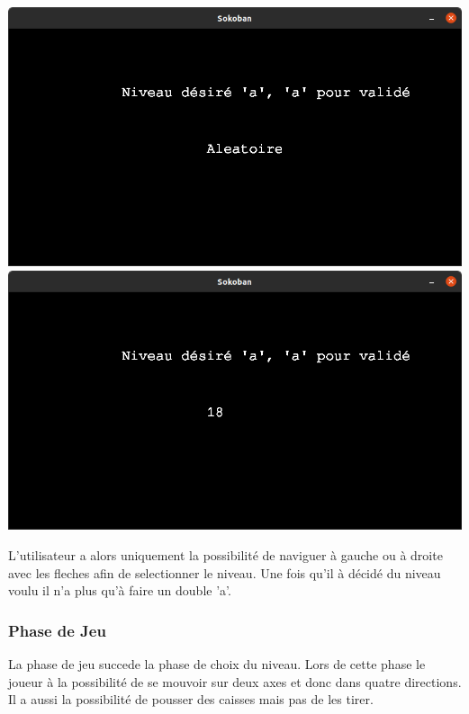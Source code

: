 \documentclass[a4paper,12pt]{article} %
\begin{document}
\includegraphics[scale = 0.25]{../picture/starting.png}
\includegraphics[scale = 0.25]{../picture/starting2.png}

L'utilisateur a alors uniquement la possibilité de naviguer à gauche ou à droite avec les fleches afin de selectionner le niveau.
Une fois qu'il à décidé du niveau voulu il n'a plus qu'à faire un double 'a'.

\subsubsection{Phase de Jeu}

La phase de jeu succede la phase de choix du niveau.
Lors de cette phase le joueur à la possibilité de se mouvoir sur deux axes et donc dans quatre directions.
Il a aussi la possibilité de pousser des caisses mais pas de les tirer.
\end{document}
